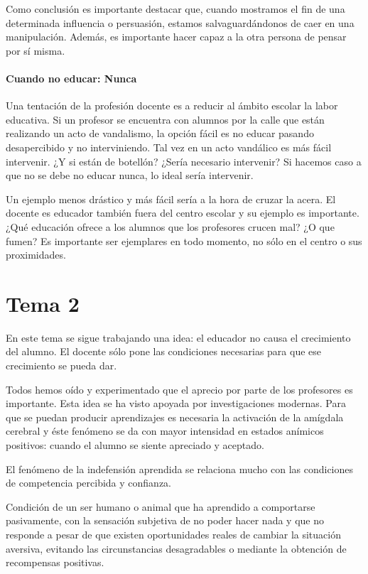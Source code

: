 Como conclusión es importante destacar que, cuando mostramos el fin de una determinada influencia o persuasión, estamos salvaguardándonos de caer en una manipulación.
%
Además, es importante hacer capaz a la otra persona de pensar por sí misma. 



\paragraph{Cuando no educar: Nunca}
Una tentación de la profesión docente es a reducir al ámbito escolar la labor educativa.
%
Si un profesor se encuentra con alumnos por la calle que están realizando un acto de vandalismo, la opción fácil es no educar pasando desapercibido y no interviniendo.
%
Tal vez en un acto vandálico es más fácil intervenir.
%
¿Y si están de botellón? ¿Sería necesario intervenir? 
%
Si hacemos caso a que no se debe no educar nunca, lo ideal sería intervenir.

Un ejemplo menos drástico y más fácil sería a la hora de cruzar la acera. 
%
El docente es educador también fuera del centro escolar y su ejemplo es importante.
%
¿Qué educación ofrece a los alumnos que los profesores crucen mal? 
%
¿O que fumen?
%
Es importante ser ejemplares en todo momento, no sólo en el centro o sus proximidades.




\section{Tema 2}

En este tema se sigue trabajando una idea: el educador no causa el crecimiento del alumno. 
%
El docente sólo pone las condiciones necesarias para que ese crecimiento se pueda dar.

Todos hemos oído y experimentado que el aprecio por parte de los profesores es importante. 
%
Esta idea se ha visto apoyada por investigaciones modernas. 
%
Para que se puedan producir aprendizajes es necesaria la activación de la amígdala cerebral y éste fenómeno se da con mayor intensidad en estados anímicos positivos: cuando el alumno se siente apreciado y aceptado.

El fenómeno de la indefensión aprendida se relaciona mucho con las condiciones de competencia percibida y confianza.

\begin{defn}
Condición de un ser humano o animal que ha aprendido a comportarse pasivamente, con la sensación subjetiva de no poder hacer nada y que no responde a pesar de que existen oportunidades reales de cambiar la situación aversiva, evitando las circunstancias desagradables o mediante la obtención de recompensas positivas.
\end{defn}

